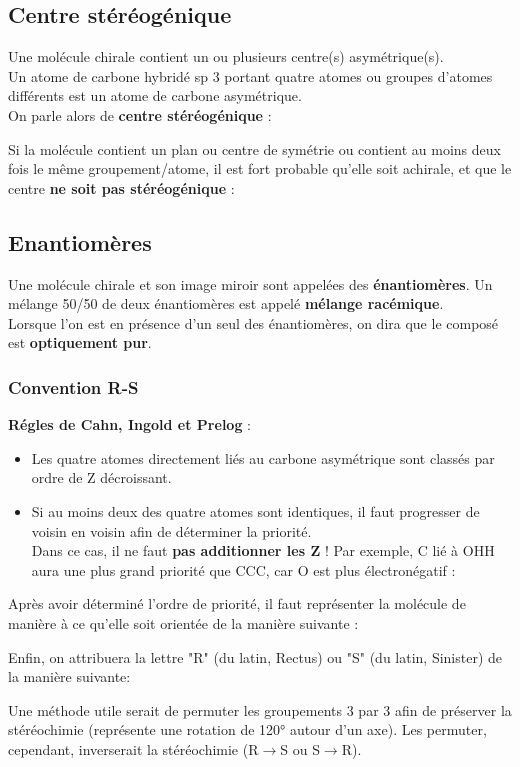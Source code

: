 \documentclass{article}
\newcommand{\insertslide}[2]{
\begin{center}
    \fbox{\texttt{[image: \#1]}}
\end{center}
}
\begin{document}
    \subsection{Centre stéréogénique}
        Une molécule chirale contient un ou plusieurs
        centre(s) asymétrique(s).\\
        Un atome de carbone hybridé sp 3 portant
        quatre atomes ou groupes d'atomes différents
        est un atome de carbone asymétrique.\\
        On parle alors de \textbf{centre stéréogénique} :
        \insertslide{Slides/CM2.pdf}{16}
        \pagebreak
        Si la molécule contient un plan ou centre de symétrie ou contient au moins deux fois le
        même groupement/atome, il est fort probable qu'elle soit achirale, et que le centre
        \textbf{ne soit pas stéréogénique} :
        \insertslide{Slides/CM2.pdf}{13}

    \subsection{Enantiomères}
    Une molécule chirale et son image miroir sont
    appelées des \textbf{énantiomères}.
    Un mélange 50/50 de deux énantiomères est
    appelé \textbf{mélange racémique}.\\
    Lorsque l'on est en présence d'un seul des énantiomères, on
    dira que le composé est \textbf{optiquement pur}.
\pagebreak
        \subsubsection{Convention R-S}
            \textbf{Régles de Cahn, Ingold et Prelog} :
            \begin{itemize}
                \item Les quatre atomes directement liés au carbone
                asymétrique sont classés par ordre de Z décroissant.
                \item Si au moins deux des quatre atomes sont identiques,
                il faut progresser de voisin en voisin afin de déterminer
                la priorité.\\
                Dans ce cas, il ne faut \textbf{pas additionner les Z} !
                Par exemple, C lié à OHH aura une plus grand priorité que CCC,
                car O est plus électronégatif :
                \insertslide{Slides/CM2.pdf}{22}
            \end{itemize}
            Après avoir déterminé l'ordre de priorité, il faut représenter
            la molécule de manière à ce qu'elle soit orientée de la manière
            suivante :
            \insertslide{Slides/CM2.pdf}{24}
\pagebreak
            Enfin, on attribuera la lettre "R" (du latin, Rectus) ou "S" (du latin, Sinister)
            de la manière suivante:
            \insertslide{Slides/CM2.pdf}{25}
            Une méthode utile serait de permuter les groupements 3 par 3 
            afin de préserver la stéréochimie (représente une rotation de 120°
            autour d'un axe).
            Les permuter, cependant, inverserait la stéréochimie (R$\rightarrow$S ou S$\rightarrow$R).
        
\end{document}
